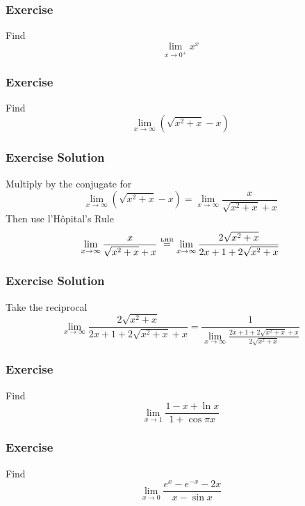 \documentclass[xcolor=dvipsnames]{beamer}
\begin{document}
\begin{frame}
  \frametitle{Exercise}
  {\ubung} Find
  \begin{equation}
    \label{eq:mahpeilu}
    \lim_{x\rightarrow{}0^{+}}x^{x}
  \end{equation}
\end{frame}

\begin{frame}
  \frametitle{Exercise}
  {\ubung} Find
  \begin{equation}
    \label{eq:eigahrai}
    \lim_{x\rightarrow\infty}(\sqrt{x^{2}+x}-x)
  \end{equation}
\end{frame}

\begin{frame}
  \frametitle{Exercise Solution}
  Multiply by the conjugate for
  \begin{equation}
    \label{eq:tureunge}
    \lim_{x\rightarrow\infty}(\sqrt{x^{2}+x}-x)=\lim_{x\rightarrow{}\infty}\frac{x}{\sqrt{x^{2}+x}+x}
  \end{equation}
Then use l'H{\^o}pital's Rule
  \begin{equation}
    \label{eq:watiepee}
    \lim_{x\rightarrow{}\infty}\frac{x}{\sqrt{x^{2}+x}+x}\stackrel{\mbox{\tiny LHR}}{=}\lim_{x\rightarrow{}\infty}\frac{2\sqrt{x^{2}+x}}{2x+1+2\sqrt{x^{2}+x}}
  \end{equation}
\end{frame}

\begin{frame}
  \frametitle{Exercise Solution}
  Take the reciprocal
  \begin{equation}
    \label{eq:gohciefe}
    \lim_{x\rightarrow{}\infty}\frac{2\sqrt{x^{2}+x}}{2x+1+2\sqrt{x^{2}+x}+x}=\frac{1}{\lim_{x\rightarrow{}\infty}\frac{2x+1+2\sqrt{x^{2}+x}+x}{2\sqrt{x^{2}+x}}}
  \end{equation}
\end{frame}

\begin{frame}
  \frametitle{Exercise}
  {\ubung} Find
  \begin{equation}
    \label{eq:vuciecha}
    \lim_{x\rightarrow{}1}\frac{1-x+\ln{}x}{1+\cos\pi{}x}
  \end{equation}
\end{frame}

\begin{frame}
  \frametitle{Exercise}
  {\ubung} Find
  \begin{equation}
    \label{eq:taihahri}
    \lim_{x\rightarrow{}0}\frac{e^{x}-e^{-x}-2x}{x-\sin{}x}
  \end{equation}
\end{frame}
\end{document}
